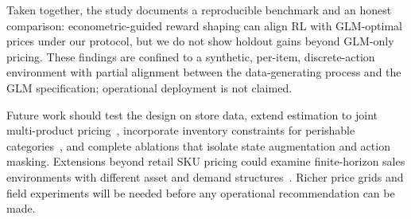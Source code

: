 \documentclass[journal, 10pt, twoside]{IEEEtran}
\begin{document}
Taken together, the study documents a reproducible benchmark and an
honest comparison: econometric-guided reward shaping can align RL with
GLM-optimal prices under our protocol, but we do not show holdout gains
beyond GLM-only pricing.
These findings are confined to a synthetic, per-item, discrete-action
environment with partial alignment between the data-generating process
and the GLM specification; operational deployment is not claimed.

Future work should test the design on store data, extend estimation to
joint multi-product pricing~\cite{kumar2026, hadi2025}, incorporate
inventory constraints for perishable categories~\cite{yavuz2024,
nomura2025}, and complete ablations that isolate state augmentation and
action masking.
Extensions beyond retail SKU pricing could examine finite-horizon sales
environments with different asset and demand
structures~\cite{meilan2026}.
Richer price grids and field experiments will be needed before any
operational recommendation can be made.

\end{document}
